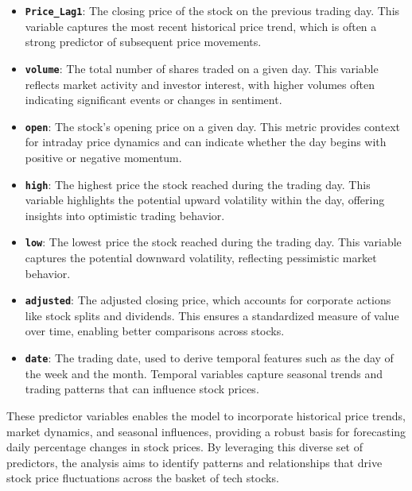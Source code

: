 \documentclass[
  letterpaper,
  DIV=11,
  numbers=noendperiod]{scrartcl}
\begin{document}
\begin{itemize}
\item
  \textbf{\texttt{Price\_Lag1}}: The closing price of the stock on the
  previous trading day. This variable captures the most recent
  historical price trend, which is often a strong predictor of
  subsequent price movements.
\item
  \textbf{\texttt{volume}}: The total number of shares traded on a given
  day. This variable reflects market activity and investor interest,
  with higher volumes often indicating significant events or changes in
  sentiment.
\item
  \textbf{\texttt{open}}: The stock's opening price on a given day. This
  metric provides context for intraday price dynamics and can indicate
  whether the day begins with positive or negative momentum.
\item
  \textbf{\texttt{high}}: The highest price the stock reached during the
  trading day. This variable highlights the potential upward volatility
  within the day, offering insights into optimistic trading behavior.
\item
  \textbf{\texttt{low}}: The lowest price the stock reached during the
  trading day. This variable captures the potential downward volatility,
  reflecting pessimistic market behavior.
\item
  \textbf{\texttt{adjusted}}: The adjusted closing price, which accounts
  for corporate actions like stock splits and dividends. This ensures a
  standardized measure of value over time, enabling better comparisons
  across stocks.
\item
  \textbf{\texttt{date}}: The trading date, used to derive temporal
  features such as the day of the week and the month. Temporal variables
  capture seasonal trends and trading patterns that can influence stock
  prices.
\end{itemize}

These predictor variables enables the model to incorporate historical
price trends, market dynamics, and seasonal influences, providing a
robust basis for forecasting daily percentage changes in stock prices.
By leveraging this diverse set of predictors, the analysis aims to
identify patterns and relationships that drive stock price fluctuations
across the basket of tech stocks.
\end{document}
